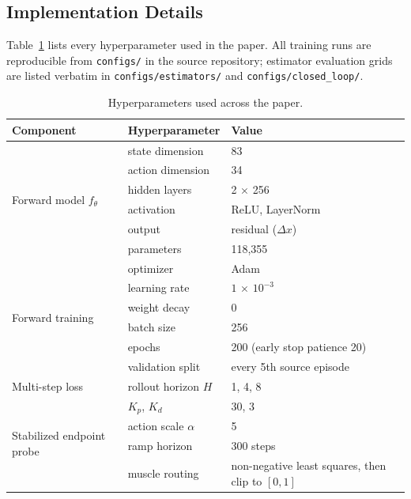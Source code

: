 \documentclass[sn-mathphys,NameDate,iicol]{sn-jnl}
\begin{document}
\begin{appendices}
\renewcommand{\theHtable}{\Alph{section}.\arabic{table}}
\section{Implementation Details}
\label{app:hyperparams}

Table~\ref{tab:hyperparams} lists every hyperparameter used in the
paper. All training runs are reproducible from
\texttt{configs/} in the source repository; estimator evaluation grids
are listed verbatim in \texttt{configs/estimators/} and
\texttt{configs/closed\_loop/}.

\begin{table}[!htbp]
\caption{Hyperparameters used across the paper.}
\label{tab:hyperparams}
\renewcommand{\arraystretch}{1.15}
\setlength{\tabcolsep}{3pt}
\scriptsize
\begin{tabular}{@{}lll@{}}
\toprule
\textbf{Component} & \textbf{Hyperparameter} & \textbf{Value} \\
\midrule
\multirow{6}{*}{Forward model $f_\theta$}
 & state dimension & 83 \\
 & action dimension & 34 \\
 & hidden layers & 2 $\times$ 256 \\
 & activation & ReLU, LayerNorm \\
 & output & residual ($\Delta x$) \\
 & parameters & 118{,}355 \\
\midrule
\multirow{6}{*}{Forward training}
 & optimizer & Adam~\cite{kingma2015adam} \\
 & learning rate & $1\,{\times}\,10^{-3}$ \\
 & weight decay & 0 \\
 & batch size & 256 \\
 & epochs & 200 (early stop patience 20) \\
 & validation split & every 5th source episode \\
\midrule
Multi-step loss
 & rollout horizon $H$ & 1, 4, 8 \\
\midrule
\multirow{4}{*}{Stabilized endpoint probe}
 & $K_p$, $K_d$ & 30, 3 \\
 & action scale $\alpha$ & 5 \\
 & ramp horizon & 300 steps \\
 & muscle routing & non-negative least squares, then clip to $[0,1]$ \\

\end{tabular}
\end{table}
\end{appendices}
\end{document}
